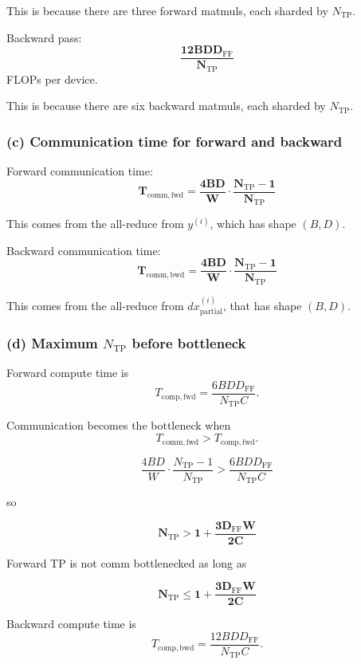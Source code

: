 \documentclass[11pt]{article}
\begin{document}
This is because there are three forward matmuls, each sharded by
\(N_{\mathrm{TP}}\).

Backward pass:
\[
\mathbf{
\frac{12 B D D_{\mathrm{FF}}}{N_{\mathrm{TP}}}
}
\]
FLOPs per device.

This is because there are six backward matmuls, each sharded by
\(N_{\mathrm{TP}}\).

\vspace{4em}

\subsubsection*{(c) Communication time for forward and backward}

Forward communication time:
\[
\mathbf{
T_{\mathrm{comm,fwd}}
=
\frac{4 B D}{W}
\cdot
\frac{N_{\mathrm{TP}} - 1}{N_{\mathrm{TP}}}
}
\]

This comes from the all-reduce from \(y^{(i)}\), which has shape
\((B, D)\).

Backward communication time:
\[
\mathbf{
T_{\mathrm{comm,bwd}}
=
\frac{4 B D}{W}
\cdot
\frac{N_{\mathrm{TP}} - 1}{N_{\mathrm{TP}}}
}
\]

This comes from the all-reduce from \(d x_{\mathrm{partial}}^{(i)}\),
that has shape \((B, D)\).

\vspace{4em}

\subsubsection*{(d) Maximum $N_{\text{TP}}$ before bottleneck}

Forward compute time is
\[
T_{\mathrm{comp,fwd}}
=
\frac{6 B D D_{\mathrm{FF}}}{N_{\mathrm{TP}} C}.
\]

Communication becomes the bottleneck when
\[
T_{\mathrm{comm,fwd}} > T_{\mathrm{comp,fwd}}.
\]

\[
\frac{4 B D}{W}
\cdot
\frac{N_{\mathrm{TP}} - 1}{N_{\mathrm{TP}}}
>
\frac{6 B D D_{\mathrm{FF}}}{N_{\mathrm{TP}} C}
\]

so

\[
\mathbf{
N_{\mathrm{TP}} > 1 + \frac{3 D_{\mathrm{FF}} W}{2C}
}
\]

Forward TP is not comm bottlenecked as long as

\[
\mathbf{
N_{\mathrm{TP}} \le 1 + \frac{3 D_{\mathrm{FF}} W}{2C}
}
\]

Backward compute time is
\[
T_{\mathrm{comp,bwd}}
=
\frac{12 B D D_{\mathrm{FF}}}{N_{\mathrm{TP}} C}.
\]
\end{document}
